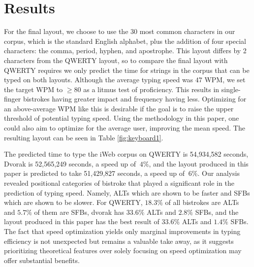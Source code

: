 \section{Results}

For the final layout, we choose to use the 30 most common characters in our corpus, which is the standard English alphabet, plus the addition of four special characters: the comma, period, hyphen, and apostrophe. This layout differs by 2 characters from the QWERTY layout, so to compare the final layout with QWERTY requires we only predict the time for strings in the corpus that can be typed on both layouts. Although the average typing speed was $47$ WPM, we set the target WPM to $\geq80$ as a litmus test of proficiency. This results in single-finger bistrokes having greater impact and frequency having less. Optimizing for an above-average WPM like this is desirable if the goal is to raise the upper threshold of potential typing speed. Using the methodology in this paper, one could also aim to optimize for the average user, improving the mean speed. The resulting layout can be seen in Table \ref{fig:keyboard1}.


\noindent The predicted time to type the iWeb corpus on QWERTY is 54,934,582 seconds, Dvorak is 52,565,249 seconds, a speed up of $~4\%$, and the layout produced in this paper is predicted to take 51,429,827 seconds, a speed up of $~6\%$. Our analysis revealed positional categories of bistroke that played a significant role in the prediction of typing speed. Namely, ALTs which are shown to be faster and SFBs which are shown to be slower. For QWERTY, $18.3\%$ of all bistrokes are ALTs and $5.7\%$ of them are SFBs, dvorak has $33.6\%$ ALTs and $2.8\%$ SFBs, and the layout produced in this paper has the best result of $33.6\%$ ALTs and $1.4\%$ SFBs. The fact that speed optimization yields only marginal improvements in typing efficiency is not unexpected but remains a valuable take away, as it suggests prioritizing theoretical features over solely focusing on speed optimization may offer substantial benefits.


